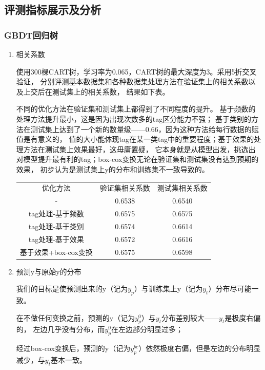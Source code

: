 \documentclass[UTF8,a4paper,12pt]{article}
\begin{document}
\newpage
\subsection{评测指标展示及分析}
\subsubsection{GBDT回归树}
\begin{enumerate}[itemindent=0.5em,label=\arabic*、]
  \item 相关系数
  \par \qquad 使用300棵CART树，学习率为0.065，CART树的最大深度为3。采用5折交叉验证，
  分别评测基本数据集和各种数据集处理方法在验证集上的相关系数以及上交后在测试集上的相关系数，
  结果如下表。
  \par \qquad 不同的优化方法在验证集和测试集上都得到了不同程度的提升。
  基于频数的处理方法提升最小，这是因为出现次数多的tag区分能力不强；
  基于类别的方法在测试集上达到了一个新的数量级——0.66，因为这种方法给每行数据的赋值是有意义的，
  值的大小能体现tag在某一类tag中的重要程度；基于效果的处理方法在测试集上效果最好，这毋庸置疑，
  它本身就是从模型出发，挑选出对模型提升最有利的tag；box-cox变换无论在验证集和测试集没有达到预期的效果，
  初步认为是测试集上y的分布和训练集不一致导致的。
  \begin{center}
    \begin{tabular}{ccc}
    \hline
    优化方法 & 验证集相关系数 & 测试集相关系数\\
    - & 0.6538 & 0.6540\\
    tag处理-基于频数 & 0.6575 & 0.6575\\
    tag处理-基于类别 & 0.6574 & 0.6614\\
    tag处理-基于效果 & 0.6572 & 0.6616\\
    基于效果+box-cox变换 & 0.6575 & 0.6598\\
    \hline
    \end{tabular}
  \end{center}
  \item 预测y与原始y的分布
  \par \qquad 我们的目标是使预测出来的y（记为$y_p$）与训练集上y（记为$y_t$）分布尽可能一致。
  \par \qquad 在不做任何变换之前，预测的y（记为$y^0_p$）与$y_t$分布差别较大——$y_t$是极度右偏的，
  左边几乎没有分布，而$y^0_p$在左边部分明显过多；
  \par \qquad 经过box-cox变换后，预测的y（记为$y^{bc}_p$）依然极度右偏，但是左边的分布明显减少，与$y_t$基本一致。
  \begin{figure}[H]

\end{figure}
\end{enumerate}
\end{document}
